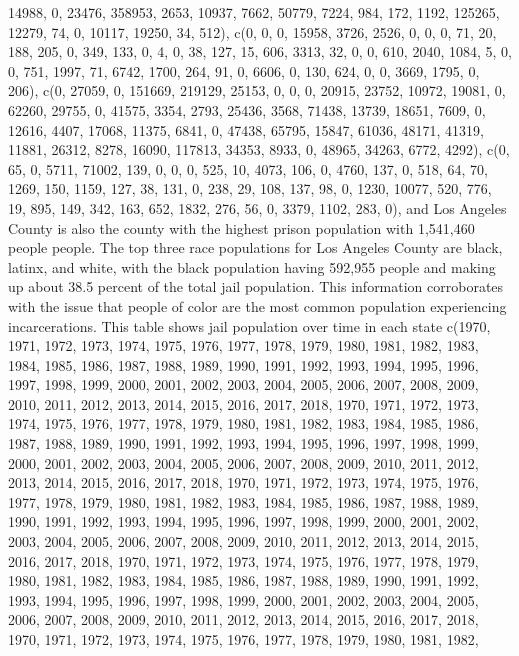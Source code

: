 \documentclass[
]{article}
\begin{document}
14988, 0, 23476, 358953, 2653, 10937, 7662, 50779, 7224, 984, 172, 1192,
125265, 12279, 74, 0, 10117, 19250, 34, 512), c(0, 0, 0, 15958, 3726,
2526, 0, 0, 0, 71, 20, 188, 205, 0, 349, 133, 0, 4, 0, 38, 127, 15, 606,
3313, 32, 0, 0, 610, 2040, 1084, 5, 0, 0, 751, 1997, 71, 6742, 1700,
264, 91, 0, 6606, 0, 130, 624, 0, 0, 3669, 1795, 0, 206), c(0, 27059, 0,
151669, 219129, 25153, 0, 0, 0, 20915, 23752, 10972, 19081, 0, 62260,
29755, 0, 41575, 3354, 2793, 25436, 3568, 71438, 13739, 18651, 7609, 0,
12616, 4407, 17068, 11375, 6841, 0, 47438, 65795, 15847, 61036, 48171,
41319, 11881, 26312, 8278, 16090, 117813, 34353, 8933, 0, 48965, 34263,
6772, 4292), c(0, 65, 0, 5711, 71002, 139, 0, 0, 0, 525, 10, 4073, 106,
0, 4760, 137, 0, 518, 64, 70, 1269, 150, 1159, 127, 38, 131, 0, 238, 29,
108, 137, 98, 0, 1230, 10077, 520, 776, 19, 895, 149, 342, 163, 652,
1832, 276, 56, 0, 3379, 1102, 283, 0), and Los Angeles County is also
the county with the highest prison population with 1,541,460 people
people. The top three race populations for Los Angeles County are black,
latinx, and white, with the black population having 592,955 people and
making up about 38.5 percent of the total jail population. This
information corroborates with the issue that people of color are the
most common population experiencing incarcerations. This table shows
jail population over time in each state c(1970, 1971, 1972, 1973, 1974,
1975, 1976, 1977, 1978, 1979, 1980, 1981, 1982, 1983, 1984, 1985, 1986,
1987, 1988, 1989, 1990, 1991, 1992, 1993, 1994, 1995, 1996, 1997, 1998,
1999, 2000, 2001, 2002, 2003, 2004, 2005, 2006, 2007, 2008, 2009, 2010,
2011, 2012, 2013, 2014, 2015, 2016, 2017, 2018, 1970, 1971, 1972, 1973,
1974, 1975, 1976, 1977, 1978, 1979, 1980, 1981, 1982, 1983, 1984, 1985,
1986, 1987, 1988, 1989, 1990, 1991, 1992, 1993, 1994, 1995, 1996, 1997,
1998, 1999, 2000, 2001, 2002, 2003, 2004, 2005, 2006, 2007, 2008, 2009,
2010, 2011, 2012, 2013, 2014, 2015, 2016, 2017, 2018, 1970, 1971, 1972,
1973, 1974, 1975, 1976, 1977, 1978, 1979, 1980, 1981, 1982, 1983, 1984,
1985, 1986, 1987, 1988, 1989, 1990, 1991, 1992, 1993, 1994, 1995, 1996,
1997, 1998, 1999, 2000, 2001, 2002, 2003, 2004, 2005, 2006, 2007, 2008,
2009, 2010, 2011, 2012, 2013, 2014, 2015, 2016, 2017, 2018, 1970, 1971,
1972, 1973, 1974, 1975, 1976, 1977, 1978, 1979, 1980, 1981, 1982, 1983,
1984, 1985, 1986, 1987, 1988, 1989, 1990, 1991, 1992, 1993, 1994, 1995,
1996, 1997, 1998, 1999, 2000, 2001, 2002, 2003, 2004, 2005, 2006, 2007,
2008, 2009, 2010, 2011, 2012, 2013, 2014, 2015, 2016, 2017, 2018, 1970,
1971, 1972, 1973, 1974, 1975, 1976, 1977, 1978, 1979, 1980, 1981, 1982,
\end{document}
